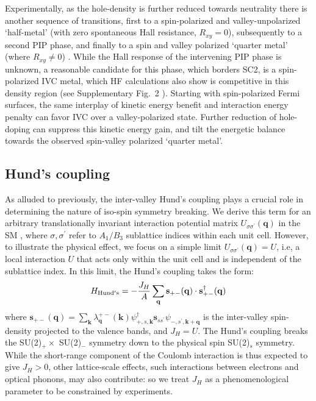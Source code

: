 \documentclass[aps,pra,twocolumn,superscriptaddress,10pt,article,nofootinbib,showpacs,longbibliography]{revtex4-1}
\def \k{{\mathbf k}}
\def \q{{\mathbf q}}
\def \s{{\mathbf s}}
\def \beq{\begin{eqnarray}}
\def \eeq{\end{eqnarray}}
\begin{document}
Experimentally, as the hole-density is further reduced towards neutrality there is another sequence of transitions, first to a spin-polarized and valley-unpolarized `half-metal' (with zero spontaneous Hall resistance, $R_{xy} = 0$), subsequently to a second PIP phase, and finally to a spin and valley polarized `quarter metal' (where $R_{xy} \neq 0$) \cite{Zhou2021_ABCmetals}.
While the Hall response of the intervening PIP phase is unknown, a reasonable candidate for this phase, which borders SC2, is a spin-polarized IVC metal, which HF calculations also show is competitive in this density region (see Supplementary Fig.~2 \cite{SM}).
Starting with spin-polarized Fermi surfaces, the same interplay of kinetic energy benefit and interaction energy penalty can favor IVC over a valley-polarized state. 
Further reduction of hole-doping can suppress this kinetic energy gain, and tilt the energetic balance towards the observed spin-valley polarized `quarter metal'.

\subsection{Hund's coupling}
\label{sec:Hunds}
As alluded to previously, the inter-valley Hund's coupling plays a crucial role in determining the nature of iso-spin symmetry breaking.
We derive this term for an arbitrary translationally invariant interaction potential matrix $U_{\sigma \sigma^\prime}(\q)$ in the SM \cite{SM}, where $\sigma,\sigma^\prime$ refer to $A_1/B_3$ sublattice indices within each unit cell. 
However, to illustrate the physical effect, we focus on a simple limit $U_{\sigma \sigma^\prime}(\q) = U$, i.e,  a local interaction $U$ that acts only within the unit cell and is independent of the sublattice index. In this limit, the Hund's coupling takes the form:
\beq
H_{\rm Hund's} = - \frac{J_H}{A} \sum_{\q} \s_{+-}(\q) \cdot \s^\dagger_{+-}(\q)
\label{eq:HHunds}
\eeq
where  $\s_{+-}(\q) = \sum_{\k} \lambda^{+-}_{\q}(\k) \psi^\dagger_{+,s,\k} \s_{s s^\prime} \psi_{-,s^\prime,\k + \q}$ is the inter-valley spin-density projected to the valence bands, and $J_H = U$.
The Hund's coupling breaks the SU(2)$_+ \times$ SU(2)$_-$ symmetry down to the physical spin SU(2)$_s$ symmetry. 
While the short-range component of the Coulomb interaction is thus expected to give $J_H >0$, other lattice-scale effects, such interactions between electrons and optical phonons, may also contribute: so we treat $J_H$ as a phenomenological parameter to be constrained by experiments.
\end{document}
